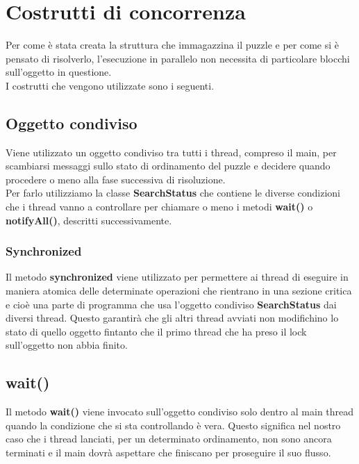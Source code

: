 % 
%
%

\section{Costrutti di concorrenza} %
\label{sec:costrutti_di_concorrenza}
Per come è stata creata la struttura che immagazzina il puzzle e per come si è pensato di risolverlo, l'esecuzione in parallelo non necessita di particolare blocchi sull'oggetto in questione. \\
I costrutti che vengono utilizzate sono i seguenti.

	\subsection{Oggetto condiviso} %
	\label{sub:oggetto_condiviso}
	Viene utilizzato un oggetto condiviso tra tutti i thread, compreso il main, per scambiarsi messaggi sullo stato di ordinamento del puzzle e decidere quando procedere o meno alla fase successiva di risoluzione. \\
	Per farlo utilizziamo la classe \textbf{SearchStatus} che contiene le diverse condizioni che i thread vanno a controllare per chiamare o meno i metodi \textbf{wait()} o \textbf{notifyAll()}, descritti successivamente.

	\subsubsection{Synchronized} %
	\label{ssub:synchronized}
	Il metodo \textbf{synchronized} viene utilizzato per permettere ai thread di eseguire in maniera atomica delle determinate operazioni che rientrano in una sezione critica e cioè una parte di programma che usa l'oggetto condiviso \textbf{SearchStatus} dai diversi thread. Questo garantirà che gli altri thread avviati non modifichino lo stato di quello oggetto fintanto che il primo thread che ha preso il lock sull'oggetto non abbia finito.
	
	\subsection{wait()} %
	\label{sub:wait_}
	Il metodo \textbf{wait()} viene invocato sull'oggetto condiviso solo dentro al main thread quando la condizione che si sta controllando è vera. Questo significa nel nostro caso che i thread lanciati, per un determinato ordinamento, non sono ancora terminati e il main dovrà aspettare che finiscano per proseguire il suo flusso.
	
